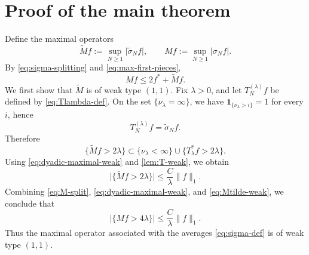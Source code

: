 \documentclass[11pt]{amsart}
\numberwithin{equation}{section}
\theoremstyle{remark}
\begin{document}
\section{Proof of the main theorem}

Define the maximal operators 
\begin{equation*}
\widetilde M f:=\sup_{N\ge1}\lvert \widetilde\sigma_N f\rvert, \qquad
Mf:=\sup_{N\ge1}\lvert \sigma_N f\rvert. 
\end{equation*}
By \eqref{eq:sigma-splitting} and \eqref{eq:max-first-pieces}, 
\begin{equation}
Mf\le 2f^*+\widetilde M f.  \label{eq:M-split}
\end{equation}
We first show that $\widetilde M$ is of weak type $(1,1)$. Fix $\lambda>0
$, and let $T_N^{(\lambda)}f$ be defined by \eqref{eq:Tlambda-def}. On the
set $\{\nu_\lambda=\infty\}$, we have $\mathbf{1}_{\{\nu_\lambda>i\}}=1$ for
every $i$, hence 
\begin{equation*}
T_N^{(\lambda)}f=\widetilde\sigma_N f. 
\end{equation*}
Therefore 
\begin{equation*}
\{\widetilde M f>2\lambda\} \subset
\{\nu_\lambda<\infty\}\cup\{T_\lambda^*f>2\lambda\}. 
\end{equation*}
Using \eqref{eq:dyadic-maximal-weak} and \cref{lem:T-weak}, we obtain 
\begin{equation}
\lvert \{\widetilde M f>2\lambda\}\rvert \le \frac{C}{\lambda}\lVert
f\rVert_1.  \label{eq:Mtilde-weak}
\end{equation}
Combining \eqref{eq:M-split}, \eqref{eq:dyadic-maximal-weak}, and %
\eqref{eq:Mtilde-weak}, we conclude that 
\begin{equation}
\lvert \{Mf>4\lambda\}\rvert \le \frac{C}{\lambda}\lVert f\rVert_1.
\label{eq:M-weak}
\end{equation}
Thus the maximal operator associated with the averages \eqref{eq:sigma-def}
is of weak type $(1,1)$.
\end{document}
